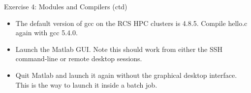 \documentclass{beamer}
\begin{document}
\begin{frame}{Exercise 4: Modules and Compilers (ctd)}
  \begin{itemize}
  \item{The default version of gcc on the RCS HPC clusters is 4.8.5. Compile hello.c again with \alert{gcc 5.4.0}.}
\item{Launch the Matlab GUI. Note this should work from either the SSH command-line or remote desktop sessions.}
\item{Quit Matlab and launch it again without the graphical desktop interface. This is the way to launch it inside a batch job.}
\end{itemize}
\end{frame}
\end{document}
